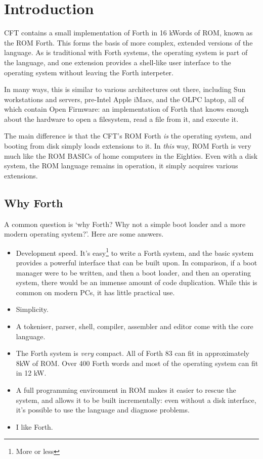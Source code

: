 
\chapter{Introduction}

CFT contains a small implementation of Forth in 16 kWords of ROM,
known as the ROM Forth. This forms the basis of more complex, extended
versions of the language. As is traditional with Forth systems, the
operating system is part of the language, and one extension provides a
shell-like user interface to the operating system without leaving the
Forth interpeter.

In many ways, this is similar to various architectures out there,
including Sun workstations and servers, pre-Intel Apple iMacs, and the
OLPC laptop, all of which contain Open Firmware: an implementation of
Forth that knows enough about the hardware to open a filesystem, read
a file from it, and execute it.

The main difference is that the CFT's ROM Forth {\em is\/} the
operating system, and booting from disk simply loads extensions to
it. In {\em this\/} way, ROM Forth is very much like the ROM BASICs of
home computers in the Eighties. Even with a disk system, the ROM
language remains in operation, it simply acquires various extensions.

\section{Why Forth}

A common question is ‘why Forth? Why not a simple boot loader and a
more modern operating system?’. Here are some answers.

\begin{itemize}
\item Development speed. It's easy\footnote{More or less} to write a
  Forth system, and the basic system provides a powerful interface
  that can be built upon. In comparison, if a boot manager were to be
  written, and then a boot loader, and then an operating system, there
  would be an immense amount of code duplication. While this is common
  on modern PCs, it has little practical use.

\item Simplicity.

\item A tokeniser, parser, shell, compiler, assembler and editor come
  with the core language.

\item The Forth system is {\em very\/} compact. All of Forth 83 can fit in
  approximately 8kW of ROM. Over 400 Forth words and most of the
  operating system can fit in 12 kW.

\item A full programming environment in ROM makes it easier to rescue
  the system, and allows it to be built incrementally: even without a
  disk interface, it's possible to use the language and diagnose
  problems.

\item I like Forth.

\end{itemize}

